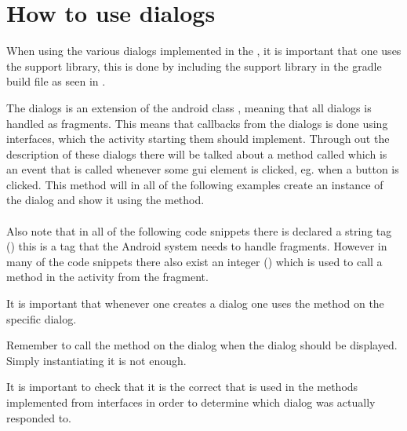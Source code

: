 \chapter{How to use dialogs}
\label{app:how_to_use_dialogs}

When using the various dialogs implemented in the \gc, it is important that one uses the support library, this is done by including the support library in the gradle build file as seen in .


\noindent
The dialogs is an extension of the android class , meaning that all dialogs is handled as fragments. This means that callbacks from the dialogs is done using interfaces, which the activity starting them should implement. Through out the description of these dialogs there will be talked about a method called  which is an event that is called whenever some gui element is clicked, eg. when a button is clicked. This method will in all of the following examples create an instance of the dialog and show it using the  method.
\\\\
Also note that in all of the following code snippets there is declared a string tag () this is a tag that the Android system needs to handle fragments. However in many of the code snippets there also exist an integer () which is used to call a method in the activity from the fragment.

\begin{note}
	It is important that whenever one creates a dialog one uses the  method on the specific dialog.
\end{note}

\begin{note}
    Remember to call the  method on the dialog when the dialog should be displayed. Simply instantiating it is not enough.
\end{note}

\begin{note}
    It is important to check that it is the correct  that is used in the methods implemented from interfaces in order to determine which dialog was actually responded to. 
\end{note}


